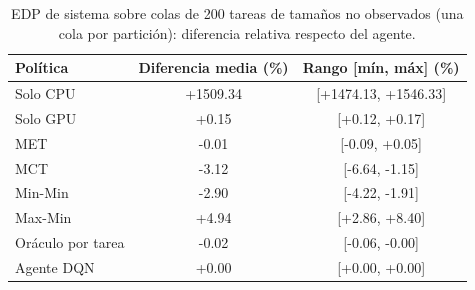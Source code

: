\begin{table}[H]
\centering
\renewcommand{\arraystretch}{1.3}
\caption{EDP de sistema sobre colas de 200 tareas de tamaños no observados (una cola por partición): diferencia relativa respecto del agente.}
\label{tab:fase4_interpolacion}
\begin{tabular}{|l|c|c|}
\hline
\textbf{Política} & \textbf{Diferencia media (\%)} & \textbf{Rango [mín, máx] (\%)} \\ \hline
Solo CPU & +1509.34 & [+1474.13, +1546.33] \\ \hline
Solo GPU & +0.15 & [+0.12, +0.17] \\ \hline
MET & -0.01 & [-0.09, +0.05] \\ \hline
MCT & -3.12 & [-6.64, -1.15] \\ \hline
Min-Min & -2.90 & [-4.22, -1.91] \\ \hline
Max-Min & +4.94 & [+2.86, +8.40] \\ \hline
Oráculo por tarea & -0.02 & [-0.06, -0.00] \\ \hline
Agente DQN & +0.00 & [+0.00, +0.00] \\ \hline
\end{tabular}
\end{table}
